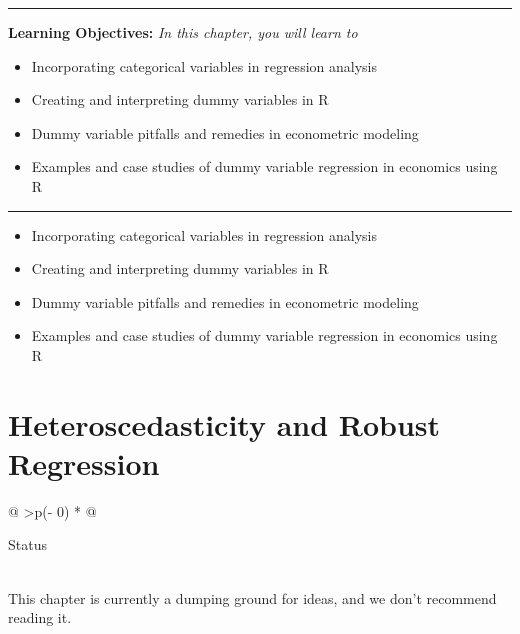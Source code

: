 \documentclass[
  letterpaper,
  paper =a4,
  twoside,
  openright,
  headsepline,
  footsepline,
  listof = totocnumbered,
  chapterprefix = true,
  firstiscover]{scrbook}
\providecommand{\abstractname}{Learning Objectives} %
\newenvironment{objectives}[1]{%
	\hrule
	\vspace{5pt}
	\small\textbf{\abstractname: } 
	\newline
	\vspace{0.1cm}
	\small\emph{#1} %
	\itshape %
}{%
	\vspace{5pt}
	\hrule
	\vspace{0.6cm}
}
\begin{document}
\begin{objectives}{In this chapter, you will learn to}
\begin{itemize}

\item{Incorporating categorical variables in regression analysis}

\item{Creating and interpreting dummy variables in R}

\item{Dummy variable pitfalls and remedies in econometric modeling}

\item{Examples and case studies of dummy variable regression in economics using R}

\end{itemize}

\end{objectives}

\begin{itemize}
\item
  Incorporating categorical variables in regression analysis
\item
  Creating and interpreting dummy variables in R
\item
  Dummy variable pitfalls and remedies in econometric modeling
\item
  Examples and case studies of dummy variable regression in economics
  using R
\end{itemize}


\hypertarget{heteroscedasticity-and-robust-regression}{%
\chapter{Heteroscedasticity and Robust
Regression}\label{heteroscedasticity-and-robust-regression}}

\begin{longtable}[]{@{}
  >{\centering\arraybackslash}p{(\columnwidth - 0\tabcolsep) * }@{}}
\toprule\noalign{}
\begin{minipage}[b]{\linewidth}\centering
Status
\end{minipage} \\
\midrule\noalign{}
\endhead
\bottomrule\noalign{}
\endlastfoot
This chapter is currently a dumping ground for ideas, and we don't
recommend reading it. \\
\end{longtable}
\end{document}
